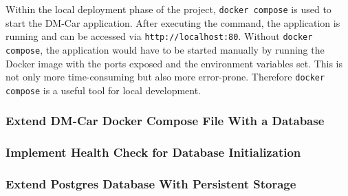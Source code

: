 Within the local deployment phase of the project, \texttt{docker compose} is used to start the DM-Car application.
After executing the command, the application is running and can be accessed via \texttt{http://localhost:80}.
Without \texttt{docker compose}, the application would have to be started manually by running the Docker image with the ports exposed and the environment variables set.
This is not only more time-consuming but also more error-prone.
Therefore \texttt{docker compose} is a useful tool for local development.
\subsubsection*{Extend DM-Car Docker Compose File With a Database}

\subsubsection*{Implement Health Check for Database Initialization}

\subsubsection*{Extend Postgres Database With Persistent Storage}